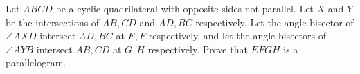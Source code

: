 Let $ABCD$ be a cyclic quadrilateral with opposite sides not parallel. Let $X$ and $Y$ be the intersections of $AB,CD$ and $AD,BC$ respectively. Let the angle bisector of $\angle AXD$ intersect $AD,BC$ at $E,F$ respectively, and let the angle bisectors of $\angle AYB$ intersect $AB,CD$ at $G,H$ respectively. Prove that $EFGH$ is a parallelogram.
